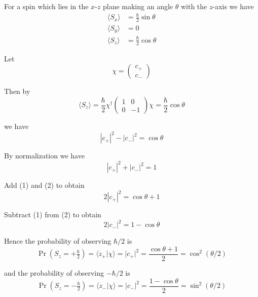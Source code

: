 


For a spin which lies in the $x$-$z$ plane
making an angle $\theta$ with the $z$-axis we have
\begin{align*}
\langle S_x\rangle&=\frac{\hbar}{2}\sin\theta
\\
\langle S_y\rangle&=0
\\
\langle S_z\rangle&=\frac{\hbar}{2}\cos\theta
\end{align*}

Let
\begin{equation*}
\chi=\begin{pmatrix}c_+\\c_-\end{pmatrix}
\end{equation*}

Then by
\begin{equation*}
\langle S_z\rangle=\frac{\hbar}{2}\chi^\dag
\begin{pmatrix}1&0\\0&-1\end{pmatrix}
\chi=\frac{\hbar}{2}\cos\theta
\end{equation*}

we have
\begin{equation*}
|c_+|^2-|c_-|^2=\cos\theta\tag{1}
\end{equation*}

By normalization we have
\begin{equation*}
|c_+|^2+|c_-|^2=1\tag{2}
\end{equation*}

Add (1) and (2) to obtain
\begin{equation*}
2|c_+|^2=\cos\theta+1
\end{equation*}

Subtract (1) from (2) to obtain
\begin{equation*}
2|c_-|^2=1-\cos\theta
\end{equation*}

Hence the probability of observing $\hbar/2$ is
\begin{equation*}
\Pr\left(S_z=+\tfrac{\hbar}{2}\right)=\langle z_+|\chi\rangle
=|c_+|^2=\frac{\cos\theta+1}{2}=\cos^2(\theta/2)
\end{equation*}

and the probability of observing $-\hbar/2$ is
\begin{equation*}
\Pr\left(S_z=-\tfrac{\hbar}{2}\right)=\langle z_-|\chi\rangle
=|c_-|^2=\frac{1-\cos\theta}{2}=\sin^2(\theta/2)
\end{equation*}


